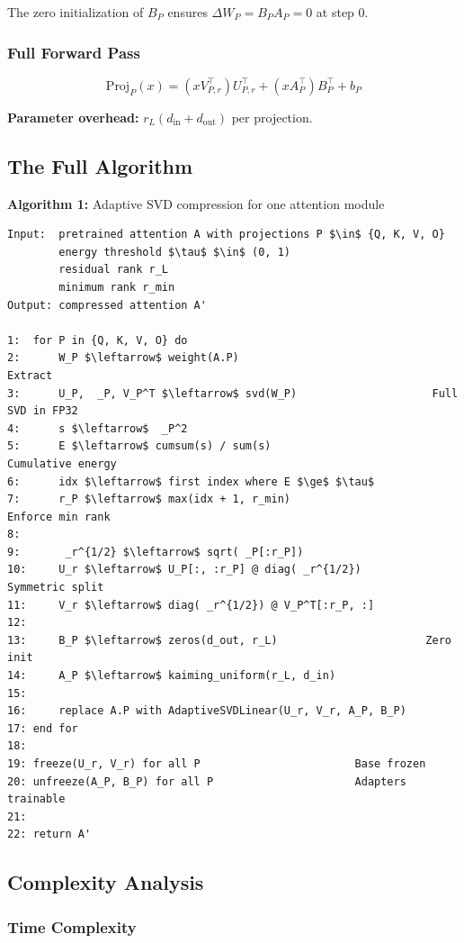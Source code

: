 The zero initialization of $B_P$ ensures $\Delta W_P = B_P A_P = 0$ at step 0.

\subsubsection{Full Forward Pass}

\[
\text{Proj}_P(x) = (x V_{P, r}^\top) U_{P, r}^\top + (x A_P^\top) B_P^\top + b_P
\tag{4.9}
\]

\textbf{Parameter overhead:} $r_L (d_\text{in} + d_\text{out})$ per projection.

\subsection{The Full Algorithm}

\textbf{Algorithm 1:} Adaptive SVD compression for one attention module
\begin{lstlisting}
Input:  pretrained attention A with projections P $\in$ {Q, K, V, O}
        energy threshold $\tau$ $\in$ (0, 1)
        residual rank r_L
        minimum rank r_min
Output: compressed attention A'

1:  for P in {Q, K, V, O} do
2:      W_P $\leftarrow$ weight(A.P)                              Extract
3:      U_P,  _P, V_P^T $\leftarrow$ svd(W_P)                     Full SVD in FP32
4:      s $\leftarrow$  _P^2
5:      E $\leftarrow$ cumsum(s) / sum(s)                        Cumulative energy
6:      idx $\leftarrow$ first index where E $\ge$ $\tau$
7:      r_P $\leftarrow$ max(idx + 1, r_min)                     Enforce min rank
8:
9:       _r^{1/2} $\leftarrow$ sqrt( _P[:r_P])
10:     U_r $\leftarrow$ U_P[:, :r_P] @ diag( _r^{1/2})          Symmetric split
11:     V_r $\leftarrow$ diag( _r^{1/2}) @ V_P^T[:r_P, :]
12:
13:     B_P $\leftarrow$ zeros(d_out, r_L)                       Zero init
14:     A_P $\leftarrow$ kaiming_uniform(r_L, d_in)
15:
16:     replace A.P with AdaptiveSVDLinear(U_r, V_r, A_P, B_P)
17: end for
18:
19: freeze(U_r, V_r) for all P                        Base frozen
20: unfreeze(A_P, B_P) for all P                      Adapters trainable
21:
22: return A'
\end{lstlisting}

\subsection{Complexity Analysis}

\subsubsection{Time Complexity}

